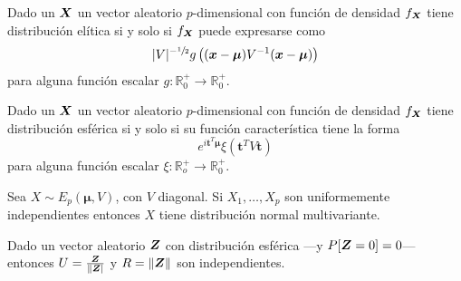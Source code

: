 \begin{nprop}
  Dado un $\boldsymbol{X}$ un vector aleatorio $p$-dimensional con función de densidad $f_{\boldsymbol{X}}$ tiene distribución elítica si y solo si $f_{\boldsymbol{X}}$ puede expresarse como \[|V|^{-\sfrac{1}{2}}g\left((\boldsymbol x - \boldsymbol \mu)V^{-1}(\boldsymbol x - \boldsymbol \mu)\right)\] para alguna función escalar $g : \mathbb R_0^+ \to \mathbb R_0^+$.
\end{nprop}

\begin{nprop}
  Dado un $\boldsymbol{X}$ un vector aleatorio $p$-dimensional con función de densidad $f_{\boldsymbol{X}}$ tiene distribución esférica si y solo si su función característica tiene la forma \[e^{i \boldsymbol t^T \boldsymbol \mu}\xi(\boldsymbol t^T V \boldsymbol t)\] para alguna función escalar $\xi: \mathbb R_o^+ \to \mathbb R_0^+$.
\end{nprop}


\begin{nprop}
  Sea $X \sim E_p(\boldsymbol \mu, V)$, con $V$ diagonal. Si $X_1, \dots, X_p$ son uniformemente independientes entonces $X$ tiene distribución normal multivariante.
\end{nprop}

\begin{nprop}
  Dado un vector aleatorio $\boldsymbol{Z}$ con distribución esférica —y $P[\boldsymbol{Z} = 0] = 0$— entonces $U = \frac{\boldsymbol{Z}}{\Vert\boldsymbol{Z}\vert}$ y $R = \Vert\boldsymbol{Z}\Vert$ son independientes.
\end{nprop}

